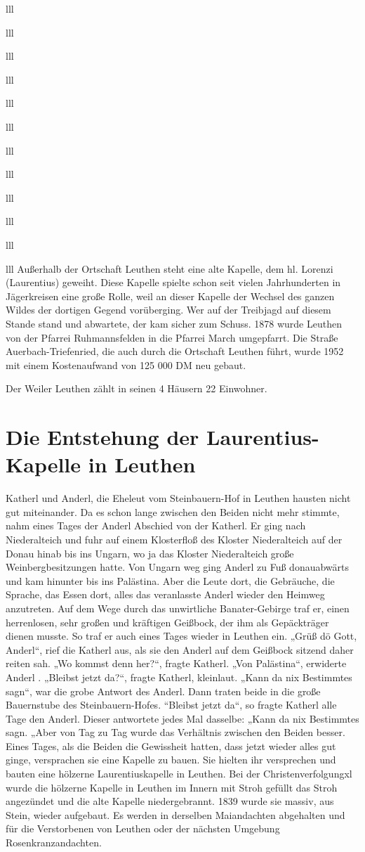 \documentclass[12pt,a4pager]{book}
\begin{document}
\begin{tabuluar}{lll}
\begin{tabuluar}{lll}
\begin{tabuluar}{lll}
\begin{tabuluar}{lll}
\begin{tabuluar}{lll}
\begin{tabuluar}{lll}
\begin{tabuluar}{lll}
\begin{tabuluar}{lll}
\begin{tabuluar}{lll}
\begin{tabuluar}{lll}
\begin{tabuluar}{lll}
\begin{tabuluar}{lll}
Außerhalb der Ortschaft Leuthen steht eine alte Kapelle, dem hl. Lorenzi
(Laurentius) geweiht. Diese Kapelle spielte schon seit vielen Jahrhunderten in
Jägerkreisen eine große Rolle, weil an dieser Kapelle der Wechsel des ganzen
Wildes der dortigen Gegend vorüberging. Wer auf der Treibjagd auf diesem Stande
stand und abwartete, der kam sicher zum Schuss. 1878 wurde Leuthen von der
Pfarrei Ruhmannsfelden in die Pfarrei March umgepfarrt. Die Straße
Auerbach-Triefenried, die auch durch die Ortschaft Leuthen führt, wurde 1952 mit
einem Kostenaufwand von 125 000 DM neu gebaut.

Der Weiler Leuthen zählt in seinen 4 Häusern 22 Einwohner.

\section{Die Entstehung der Laurentius-Kapelle in Leuthen}

Katherl und Anderl, die Eheleut vom Steinbauern-Hof in Leuthen hausten nicht gut
miteinander. Da es schon lange zwischen den Beiden nicht mehr stimmte, nahm
eines Tages der Anderl Abschied von der Katherl. Er ging nach Niederalteich und
fuhr auf einem Klosterfloß des Kloster Niederalteich auf der Donau hinab bis ins
Ungarn, wo ja das Kloster Niederalteich große Weinbergbesitzungen hatte. Von
Ungarn weg ging Anderl zu Fuß donauabwärts und kam hinunter bis ins Palästina.
Aber die Leute dort, die Gebräuche, die Sprache, das Essen dort, alles das
veranlasste Anderl wieder den Heimweg anzutreten. Auf dem Wege durch das
unwirtliche Banater-Gebirge traf er, einen herrenlosen, sehr großen und
kräftigen Geißbock, der ihm als Gepäckträger dienen musste. So traf er auch
eines Tages wieder in Leuthen ein. „Grüß dö Gott, Anderl“, rief die Katherl aus,
als sie den Anderl auf dem Geißbock sitzend daher reiten sah. „Wo kommst denn
her?“, fragte Katherl. „Von Palästina“, erwiderte Anderl . „Bleibst jetzt da?“,
fragte Katherl, kleinlaut. „Kann da nix Bestimmtes sagn“, war die grobe Antwort
des Anderl. Dann traten beide in die große Bauernstube des Steinbauern-Hofes.
“Bleibst jetzt da“, so fragte Katherl alle Tage den Anderl. Dieser antwortete
jedes Mal dasselbe: „Kann da nix Bestimmtes sagn. „Aber von Tag zu Tag wurde das
Verhältnis zwischen den Beiden besser. Eines Tages, als die Beiden die
Gewissheit hatten, dass jetzt wieder alles gut ginge, versprachen sie eine
Kapelle zu bauen. Sie hielten ihr versprechen und bauten eine hölzerne
Laurentiuskapelle in Leuthen. Bei der Christenverfolgungxl wurde die hölzerne
Kapelle in Leuthen im Innern mit Stroh gefüllt das Stroh angezündet und die alte
Kapelle niedergebrannt. 1839 wurde sie massiv, aus Stein, wieder aufgebaut. Es
werden in derselben Maiandachten abgehalten und für die Verstorbenen von Leuthen
oder der nächsten Umgebung Rosenkranzandachten.


\end{tabuluar}
\end{tabuluar}
\end{tabuluar}
\end{tabuluar}
\end{tabuluar}
\end{tabuluar}
\end{tabuluar}
\end{tabuluar}
\end{tabuluar}
\end{tabuluar}
\end{tabuluar}
\end{tabuluar}
\end{document}
